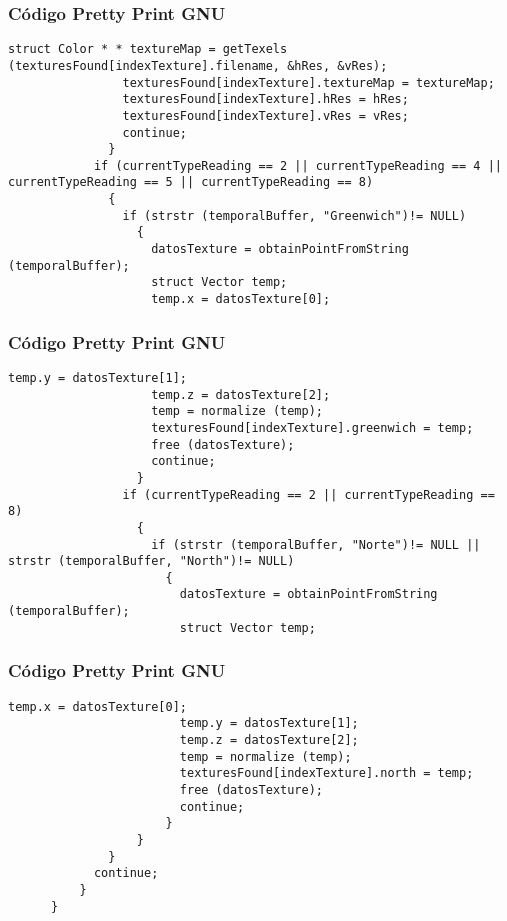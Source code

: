 \documentclass{beamer}
\begin{document}
\begin{frame}[fragile]
\frametitle{C\'odigo Pretty Print GNU}
\begin{lstlisting}[style=CStyle]
                struct Color * * textureMap = getTexels (texturesFound[indexTexture].filename, &hRes, &vRes);
                texturesFound[indexTexture].textureMap = textureMap;
                texturesFound[indexTexture].hRes = hRes;
                texturesFound[indexTexture].vRes = vRes;
                continue;
              }
            if (currentTypeReading == 2 || currentTypeReading == 4 || currentTypeReading == 5 || currentTypeReading == 8)
              {
                if (strstr (temporalBuffer, "Greenwich")!= NULL)
                  {
                    datosTexture = obtainPointFromString (temporalBuffer);
                    struct Vector temp;
                    temp.x = datosTexture[0];
\end{lstlisting}
\end{frame}
\begin{frame}[fragile]
\frametitle{C\'odigo Pretty Print GNU}
\begin{lstlisting}[style=CStyle]
                    temp.y = datosTexture[1];
                    temp.z = datosTexture[2];
                    temp = normalize (temp);
                    texturesFound[indexTexture].greenwich = temp;
                    free (datosTexture);
                    continue;
                  }
                if (currentTypeReading == 2 || currentTypeReading == 8)
                  {
                    if (strstr (temporalBuffer, "Norte")!= NULL || strstr (temporalBuffer, "North")!= NULL)
                      {
                        datosTexture = obtainPointFromString (temporalBuffer);
                        struct Vector temp;
\end{lstlisting}
\end{frame}
\begin{frame}[fragile]
\frametitle{C\'odigo Pretty Print GNU}
\begin{lstlisting}[style=CStyle]
                        temp.x = datosTexture[0];
                        temp.y = datosTexture[1];
                        temp.z = datosTexture[2];
                        temp = normalize (temp);
                        texturesFound[indexTexture].north = temp;
                        free (datosTexture);
                        continue;
                      }
                  }
              }
            continue;
          }
      }
\end{lstlisting}
\end{frame}
\end{document}
